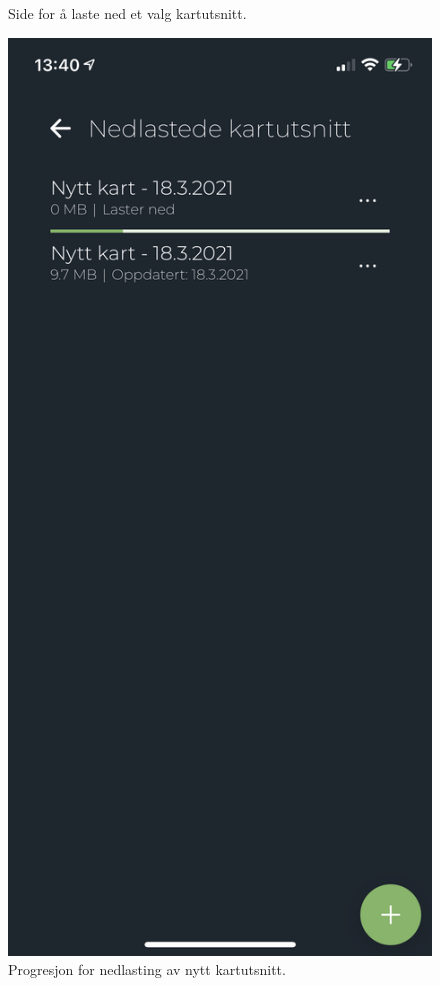 \begin{figure}[H]
\begin{minipage}[b]{0.4\textwidth}
    \caption{Side for å laste ned et valg kartutsnitt.}
    \label{fig:last-ned-nytt-kartutsnitt}
  \end{minipage}
  \hfill
  \begin{minipage}[b]{0.4\textwidth}
    \centering
    \includegraphics[scale=0.4]{Figurer/skjermbilder/nedlasting-av-nytt-kartutsnitt.png}
    \caption{Progresjon for nedlasting av nytt kartutsnitt.}
    \label{fig:nedlasting-av-nytt-kartutsnitt}
  \end{minipage}
\end{figure}

